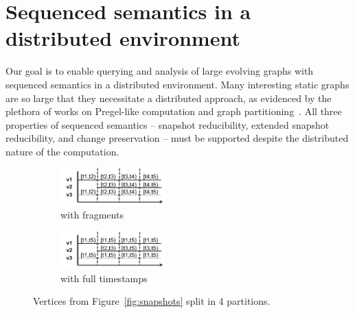 \section{Sequenced semantics in a \\ distributed environment}
\label{sec:consider}


Our goal is to enable querying and analysis of large evolving graphs
with sequenced semantics in a distributed environment.  Many
interesting static graphs are so large that they necessitate a
distributed approach, as evidenced by the plethora of works on
Pregel-like computation and graph partitioning~\cite{McCune2015}.  All
three properties of sequenced semantics -- snapshot reducibility,
extended snapshot reducibility, and change preservation -- must be
supported despite the distributed nature of the computation.



\begin{figure}
\begin{subfigure}[b]{1.6in}
\includegraphics[width=1.6in]{figs/split.pdf}
\caption{with fragments}
\vspace{-0.2cm}
\label{fig:split}
\end{subfigure}
\begin{subfigure}[b]{1.6in}
\includegraphics[width=1.6in]{figs/split2.pdf}
\caption{with full timestamps}
\vspace{-0.2cm}
\label{fig:split2}
\end{subfigure}
\caption{Vertices from Figure~\ref{fig:snapshots} split in 4 partitions.}
\vspace{-0.5cm}
\end{figure}

